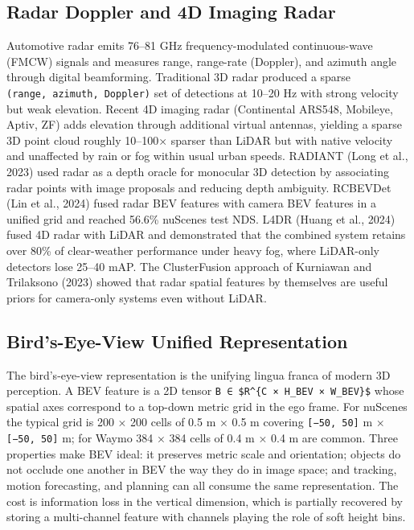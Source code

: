 \subsection{Radar Doppler and 4D Imaging Radar}\label{radar-doppler-and-4d-imaging-radar}

Automotive radar emits 76--81 GHz frequency-modulated continuous-wave (FMCW) signals and measures range, range-rate (Doppler), and azimuth angle through digital beamforming. Traditional 3D radar produced a sparse \texttt{(range,\ azimuth,\ Doppler)} set of detections at 10--20 Hz with strong velocity but weak elevation. Recent 4D imaging radar (Continental ARS548, Mobileye, Aptiv, ZF) adds elevation through additional virtual antennas, yielding a sparse 3D point cloud roughly 10--100× sparser than LiDAR but with native velocity and unaffected by rain or fog within usual urban speeds. RADIANT (Long et al., 2023) used radar as a depth oracle for monocular 3D detection by associating radar points with image proposals and reducing depth ambiguity. RCBEVDet (Lin et al., 2024) fused radar BEV features with camera BEV features in a unified grid and reached 56.6\% nuScenes test NDS. L4DR (Huang et al., 2024) fused 4D radar with LiDAR and demonstrated that the combined system retains over 80\% of clear-weather performance under heavy fog, where LiDAR-only detectors lose 25--40 mAP. The ClusterFusion approach of Kurniawan and Trilaksono (2023) showed that radar spatial features by themselves are useful priors for camera-only systems even without LiDAR.

\subsection{Bird's-Eye-View Unified Representation}\label{birds-eye-view-unified-representation}

The bird's-eye-view representation is the unifying lingua franca of modern 3D perception. A BEV feature is a 2D tensor \texttt{B\ ∈\ \$R\^{}\{C\ ×\ H\_BEV\ ×\ W\_BEV\}\$} whose spatial axes correspond to a top-down metric grid in the ego frame. For nuScenes the typical grid is 200 × 200 cells of 0.5 m × 0.5 m covering \texttt{{[}−50,\ 50{]}} m × \texttt{{[}−50,\ 50{]}} m; for Waymo 384 × 384 cells of 0.4 m × 0.4 m are common. Three properties make BEV ideal: it preserves metric scale and orientation; objects do not occlude one another in BEV the way they do in image space; and tracking, motion forecasting, and planning can all consume the same representation. The cost is information loss in the vertical dimension, which is partially recovered by storing a multi-channel feature with channels playing the role of soft height bins.

